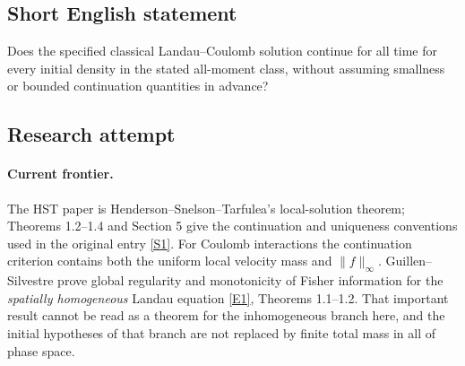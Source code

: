 \documentclass[11pt,a4paper]{article}
\newcommand{\sref}[2]{\hyperlink{source:#1:#2}{[S#2]}}
\newcommand{\eref}[2]{\hyperlink{extra:#1:#2}{[E#2]}}
\newif\ifshowcatalogue
\newcommand{\cataloguescope}[1]{\ifshowcatalogue
 \paragraph{Exact scope in the supplied catalogue.}
 \begin{quote}\small #1\end{quote}\fi}
\numberwithin{equation}{section}
\begin{document}
\cataloguescope{Fix a positive physical constant a. On [0,infinity) times R\textasciicircum{}3\_x times R\textasciicircum{}3\_v consider the classical Landau equation (partial\_t+v dot grad\_x)f=Q(f,f), where Q(f,f)=div\_v integral\_\{R\textasciicircum{}3\} A(v-w)[f(t,x,w) grad\_v f(t,x,v)-f(t,x,v) grad\_w f(t,x,w)]dw and A(z)=a |z|\textasciicircum{}(-1)(I-z tensor z/|z|\textasciicircum{}2) for z!=0. For every nonnegative initial datum f\_0 on R\textasciicircum{}6 with f\_0 in the global Holder space C\textasciicircum{}alpha for some 0<alpha<1, sup\_\{x,v\}<v>\textasciicircum{}k f\_0(x,v)<infinity for every k>=0, and constants delta,r\_0,R>0 such that for every x there exists |v\_x|<R with f\_0>=delta on the Euclidean R\textasciicircum{}6 ball B\_\{r\_0\}(x,v\_x), does the classical solution branch constructed in HST Theorems 1.2–1.4 have maximal continuation time T\_E=infinity? Here <v>=(1+|v|\textasciicircum{}2)\textasciicircum{}(1/2); the branch matches f\_0 as t decreases to zero, is smooth for positive time, and has all polynomial velocity weights bounded on every finite time slab of its existence. The exact question is global extension of that branch, with the sufficiently decaying uniformly continuous kinetic weak uniqueness convention in HST Section 5, not uniqueness among all generalized weak solutions. The HST Coulomb continuation quantity is Psi(T)=esssup\_\{0<=t<=T,x\} integral f(t,x,v)dv + esssup\_\{0<=t<=T,x,v\} f(t,x,v). Finite Psi on every finite time slab is the associated continuation criterion, not an extra hypothesis presumed true. No smallness near equilibrium, finite total spatial mass or uniform bound across different initial data is imposed.}
\subsection{Short English statement}
Does the specified classical Landau–Coulomb solution continue for all time for every initial density in the stated all-moment class, without assuming smallness or bounded continuation quantities in advance?
\subsection{Research attempt}

\paragraph{Current frontier.}
The HST paper is Henderson--Snelson--Tarfulea's local-solution theorem;
Theorems 1.2--1.4 and Section 5 give the continuation and uniqueness
conventions used in the original entry \sref{179}{1}. For Coulomb
interactions the continuation criterion contains both the uniform local
velocity mass and $\|f\|_\infty$. Guillen--Silvestre prove global regularity
and monotonicity of Fisher information for the \emph{spatially homogeneous}
Landau equation \eref{179}{1}, Theorems 1.1--1.2. That important result
cannot be read as a theorem for the inhomogeneous branch here, and the
initial hypotheses of that branch are not replaced by finite total mass
in all of phase space.
\end{document}
